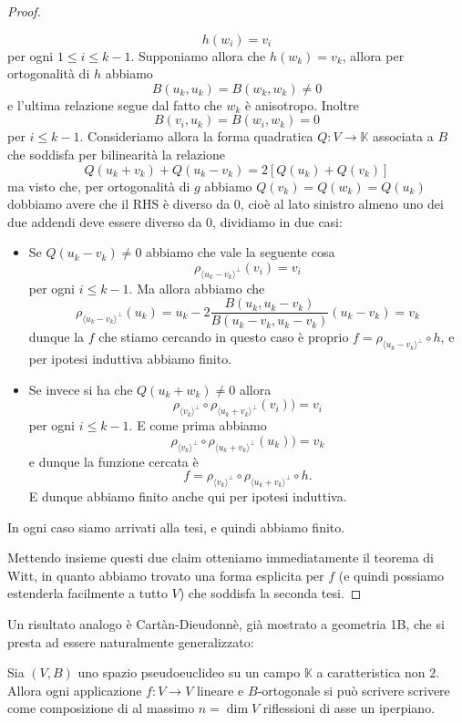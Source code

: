 \documentclass[11pt]{scrartcl}
\newcommand{\KK}{\mathbb{K}}
\begin{document}
\begin{proof}
\begin{subproof}
			$$h(w_i)=v_i$$
			per ogni $1\le i \le k-1$. Supponiamo allora che $h(w_k)=v_k$, allora per ortogonalità di $h$ abbiamo
			$$B(u_k,u_k)=B(w_k,w_k)\ne 0$$
			e l'ultima relazione segue dal fatto che $w_k$ è anisotropo. Inoltre
			$$B(v_i,u_k)=B(w_i,w_k)=0$$
			per $i\le k-1$. Consideriamo allora la forma quadratica $Q:V\to \KK$ associata a $B$ che soddisfa per bilinearità la relazione
			$$Q(u_k+v_k)+Q(u_k-v_k)=2\left[Q(u_k)+Q(v_k)\right]$$
			ma visto che, per ortogonalità di $g$ abbiamo $Q(v_k)=Q(w_k)=Q(u_k)$ dobbiamo avere che il RHS è diverso da $0$, cioè al lato sinistro almeno uno dei due addendi deve essere diverso da $0$, dividiamo in due casi:
			\begin{itemize}
				\item Se $Q(u_k-v_k)\ne 0$ abbiamo che vale la seguente cosa
				$$\rho_{\langle u_k-v_k \rangle^\perp}(v_i)=v_i$$
				per ogni $i\le k-1$. Ma allora abbiamo che
				$$\rho_{\langle u_k-v_k \rangle^\perp}(u_k)=u_k-2\frac{B(u_k,u_k-v_k)}{B(u_k-v_k,u_k-v_k)}(u_k-v_k)=v_k$$
				dunque la $f$ che stiamo cercando in questo caso è proprio $f=\rho_{\langle u_k-v_k \rangle^\perp} \circ h$, e per ipotesi induttiva abbiamo finito.
				\item Se invece si ha che $Q(u_k+w_k)\ne 0$ allora 
				$$\rho_{\langle v_k\rangle^\perp} \circ \rho_{\langle u_k+v_k \rangle^\perp}(v_i))=v_i$$
				per ogni $i\le k-1$. E come prima abbiamo
				$$\rho_{\langle v_k\rangle^\perp} \circ \rho_{\langle u_k+v_k \rangle^\perp}(u_k))=v_k$$
				e dunque la funzione cercata è
				$$f=\rho_{\langle v_k\rangle^\perp}\circ \rho_{\langle u_k + v_k \rangle^\perp}\circ h.$$
				E dunque abbiamo finito anche qui per ipotesi induttiva.
			\end{itemize}
			In ogni caso siamo arrivati alla tesi, e quindi abbiamo finito.
		\end{subproof}
		Mettendo insieme questi due claim otteniamo immediatamente il teorema di Witt, in quanto abbiamo trovato una forma esplicita per $f$ (e quindi possiamo estenderla facilmente a tutto $V$) che soddisfa la seconda tesi.
	\end{proof}
	Un risultato analogo è Cartàn-Dieudonnè, già mostrato a geometria 1B, che si presta ad essere naturalmente generalizzato:
	\begin{corollary}
		Sia $(V,B)$ uno spazio pseudoeuclideo su un campo $\KK$ a caratteristica non $2$. Allora ogni applicazione $f:V\to V$ lineare e $B$-ortogonale si può scrivere scrivere come composizione di al massimo $n=\dim V$ riflessioni di asse un iperpiano.
 	\end{corollary}
\end{document}
